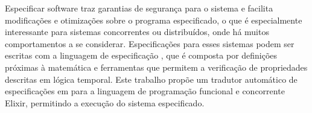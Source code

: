 Especificar software traz garantias de segurança para o sistema e facilita modificações e otimizações sobre o programa especificado, o que é especialmente interessante para sistemas concorrentes ou distribuídos, onde há muitos comportamentos a se considerar. Especificações para esses sistemas podem ser escritas com a linguagem de especificação \TLAA, que é composta por definições próximas à matemática e ferramentas que permitem a verificação de propriedades descritas em lógica temporal. Este trabalho propõe um tradutor automático de especificações em \TLA para a linguagem de programação funcional e concorrente Elixir, permitindo a execução do sistema especificado.
